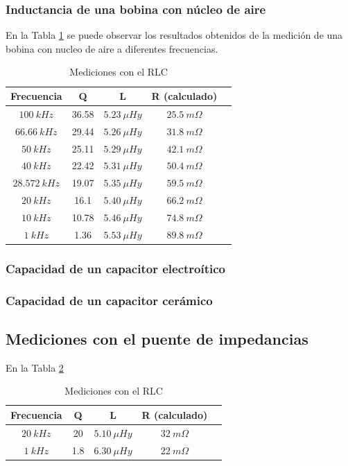 \documentclass[a4paper,10pt]{article}
\begin{document}
		\subsubsection{Inductancia de una bobina con n\'ucleo de aire}
		En la Tabla \ref{tabRLCbobina} se puede observar los resultados obtenidos de la medici\'on de una bobina con nucleo de aire a diferentes frecuencias.
		\begin{table}[!htp]
					\centering
					\begin{tabular}{|c|c|c|c|c|}
						\hline
			    		Frecuencia & Q & L  & R (calculado) \\
						\hline
						$100~kHz$& 36.58 & $5.23~\mu Hy$ &$ 25.5~m\Omega$ \\
						\hline
						$66.66~kHz$& 29.44 & $5.26~\mu Hy$ &$ 31.8~m\Omega$ \\
						\hline
						$50~kHz$& 25.11 & $5.29~\mu Hy$ &$ 42.1~m\Omega$ \\
						\hline  
						$40~kHz$& 22.42 & $5.31~\mu Hy$ &$ 50.4~m\Omega$ \\
						\hline  										
						$28.572~kHz$& 19.07 & $5.35~\mu Hy$ &$ 59.5~m\Omega$ \\
						\hline
						$20~kHz$& 16.1 & $5.40~\mu Hy$ &$ 66.2~m\Omega$ \\
						\hline  
						$10~kHz$& 10.78 & $5.46~\mu Hy$ &$ 74.8~m\Omega$ \\
						\hline 										
						$1~kHz$& 1.36 & $5.53~\mu Hy$ &$ 89.8~m\Omega$ \\
						\hline 	  
					\end{tabular}
					\caption{Mediciones con el RLC} \label{tabRLCbobina}
				\end{table}
						
		\subsubsection{Capacidad de un capacitor electro\'itico}	
		\subsubsection{Capacidad de un capacitor cer\'amico}
		
		\subsection{Mediciones con el puente de impedancias}
		En la Tabla \ref{tabPUENTEbobina}
		\begin{table}[!htp]
					\centering
					\begin{tabular}{|c|c|c|c|c|}
						\hline
			    		Frecuencia & Q & L  & R (calculado) \\
						\hline
						$20~kHz$& 20 & $5.10~\mu Hy$ &$ 32~m\Omega$ \\
						\hline
						$1~kHz$& 1.8 & $6.30~\mu Hy$ &$ 22~m\Omega$ \\
						\hline	  
					\end{tabular}
					\caption{Mediciones con el RLC} \label{tabPUENTEbobina}
				\end{table}	
\end{document}
